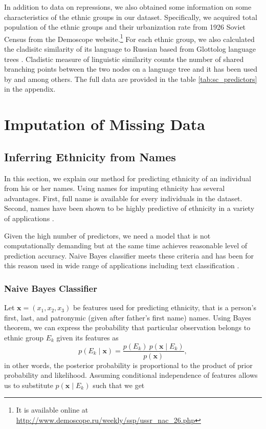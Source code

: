 In addition to data on repressions, we also obtained some information on some characteristics of the  ethnic groups in our dataset. 
Specifically, we acquired total population of the ethnic groups and their urbanization rate from 1926 Soviet Census from the Demoscope website.\footnote{It is available online at \url{http://www.demoscope.ru/weekly/ssp/ussr_nac_26.php}} For each ethnic group, we also calculated the cladisitc similarity of its language to Russian based from Glottolog language trees \citep{hammarstrom_glottolog_2018}.
Cladistic measure of linguistic similarity counts the number of shared branching points between the two nodes on a language tree and it has been used by \citet{fearon_ethnic_2003} and \citet{dickens_ethnolinguistic_2018} among others. 
The full data are provided in the table \ref{tab:sc_predictors} in the appendix.


\newpage
\section{Imputation of Missing Data} \label{sec:missing_data}
\subsection{Inferring Ethnicity from Names} \label{subsec:inferring_ethnicity}
In this section, we explain our method for predicting ethnicity of an individual from his or her names. Using names for imputing ethnicity has several advantages. First, full name  is available for every individuals in the dataset. Second, names have been shown to be highly predictive of ethnicity in a variety of applications \citep{mateos_review_2007, hofstra_sources_2017, hofstra_predicting_2018}. 

Given the high number of predictors, we need a model that is not  computationally demanding but at the same time achieves reasonable level of prediction accuracy. Naive Bayes classifier meets these criteria and has been for this reason used in wide range of applications including text classification  \citep{gentzkow_text_2019}.

\subsubsection{Naive Bayes Classifier}
Let  $\boldsymbol{x} = \left(x_1, x_2, x_3\right)$ be features used for predicting ethnicity, that is a person's first, last, and patronymic (given after father's first name) names. Using Bayes theorem, we can express the probability that particular observation  belongs to ethnic group $E_k$ given its features as
\begin{equation}
p(E_k \mid \mathbf{x}) = \frac{p(E_k) \ p(\mathbf{x} \mid E_k)}{p(\mathbf{x})},
\end{equation}
in other words, the posterior probability is proportional to the product of prior probability and likelihood. 
Assuming conditional independence of features allows us to substitute $p(\mathbf{x} \mid E_k)$ such that we get


